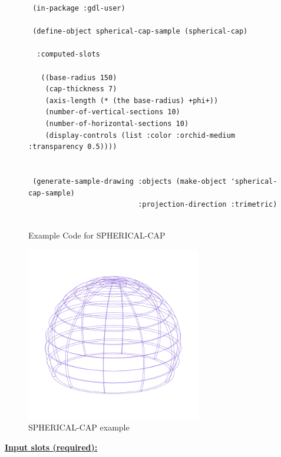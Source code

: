 \documentclass [11pt]{book}
\begin{document}
\begin{itemize}
\begin{figure}
\begin{lrbox}{\boxedverb}
\begin{minipage}{\linewidth}
{\begin{verbatim}
 (in-package :gdl-user)

 (define-object spherical-cap-sample (spherical-cap)
   
  :computed-slots

   ((base-radius 150)
    (cap-thickness 7)
    (axis-length (* (the base-radius) +phi+))
    (number-of-vertical-sections 10)
    (number-of-horizontal-sections 10)
    (display-controls (list :color :orchid-medium :transparency 0.5))))
  

 (generate-sample-drawing :objects (make-object 'spherical-cap-sample) 
                          :projection-direction :trimetric)
                  

\end{verbatim}}
\end{minipage}
\end{lrbox}
\fbox{\usebox{\boxedverb}}

\caption{Example Code for SPHERICAL-CAP}

\label{fig:example-code-SPHERICAL-CAP}

\end{figure}

\begin{figure}
\begin{center}
\includegraphics[width=3in,height=3in]{../images/example-SPHERICAL-CAP.pdf}
\end{center}

\caption{SPHERICAL-CAP example}

\label{fig:SPHERICAL-CAP}

\end{figure}





\textbf{
\underline{Input slots (required):}}

\begin{description}


\end{description}
\end{itemize}
\end{document}
